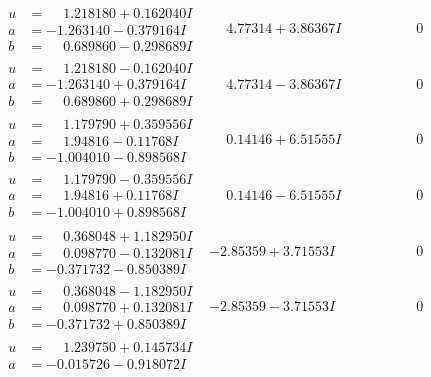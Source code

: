 \documentclass[1p]{elsarticle_modified}
\theoremstyle{definition}
\begin{document}
$$\begin{array}{c|c|c}
 \hline 
\begin{aligned}
u &= \phantom{-}1.218180 + 0.162040 I \\
a &= -1.263140 - 0.379164 I \\
b &= \phantom{-}0.689860 - 0.298689 I\end{aligned}
 & \phantom{-}4.77314 + 3.86367 I & \phantom{-0.000000 } 0 \\ \hline\begin{aligned}
u &= \phantom{-}1.218180 - 0.162040 I \\
a &= -1.263140 + 0.379164 I \\
b &= \phantom{-}0.689860 + 0.298689 I\end{aligned}
 & \phantom{-}4.77314 - 3.86367 I & \phantom{-0.000000 } 0 \\ \hline\begin{aligned}
u &= \phantom{-}1.179790 + 0.359556 I \\
a &= \phantom{-}1.94816 - 0.11768 I \\
b &= -1.004010 - 0.898568 I\end{aligned}
 & \phantom{-}0.14146 + 6.51555 I & \phantom{-0.000000 } 0 \\ \hline\begin{aligned}
u &= \phantom{-}1.179790 - 0.359556 I \\
a &= \phantom{-}1.94816 + 0.11768 I \\
b &= -1.004010 + 0.898568 I\end{aligned}
 & \phantom{-}0.14146 - 6.51555 I & \phantom{-0.000000 } 0 \\ \hline\begin{aligned}
u &= \phantom{-}0.368048 + 1.182950 I \\
a &= \phantom{-}0.098770 - 0.132081 I \\
b &= -0.371732 - 0.850389 I\end{aligned}
 & -2.85359 + 3.71553 I & \phantom{-0.000000 } 0 \\ \hline\begin{aligned}
u &= \phantom{-}0.368048 - 1.182950 I \\
a &= \phantom{-}0.098770 + 0.132081 I \\
b &= -0.371732 + 0.850389 I\end{aligned}
 & -2.85359 - 3.71553 I & \phantom{-0.000000 } 0 \\ \hline\begin{aligned}
u &= \phantom{-}1.239750 + 0.145734 I \\
a &= -0.015726 - 0.918072 I \\

\end{aligned}
\end{array}$$
\end{document}
